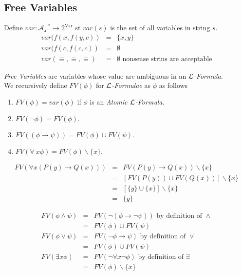 \documentclass[11pt,a4paper]{article}
\begin{document}
\subsection{Free Variables}

Define $var:\mathcal{A_L}^*\to2^\text{Var}$ st $var(s)$ is the set of all variables in string $s$.\\

\examplee{$\var(\cdot)$}
\[\begin{array}{rcl}
var(f(x,f(y,c))&=&\{x,y\}\\
var(f(c,f(c,c))&=&\emptyset\\
var(\equiv,\equiv,\equiv)&=&\emptyset\text{ nonsense strins are acceptable}
\end{array}\]

\textit{Free Variables} are variables whose value are ambiguous in an \textit{$\mathcal{L}$-Formula}.\\

We recursively define $FV(\phi)$ for \textit{$\mathcal{L}$-Formulae} as $\phi$ as follows
\begin{enumerate}
	\item $FV(\phi)=var(\phi)$ if $\phi$ is an \textit{Atomic $\mathcal{L}$-Formula}.
	\item $FV(\neg\phi)=FV(\phi)$.
	\item $FV((\phi\to\psi))=FV(\phi)\cup FV(\psi)$.
	\item $FV(\forall\ x\phi)=FV(\phi)\backslash\{x\}$.
\end{enumerate}

\[\begin{array}{rcl}
FV(\forall x(P(y)\to Q(x)))&=&FV(P(y)\to Q(x))\backslash\{x\}\\
&=&[FV(P(y))\cup FV(Q(x))]\backslash\{x\}\\
&=&[\{y\}\cup\{x\}]\backslash\{x\}\\
&=&\{y\}
\end{array}\]

\[\begin{array}{rcl}
FV(\phi\wedge\psi)&=&FV(\neg(\phi\to\neg\psi))\text{ by definition of }\wedge\\
&=&FV(\phi)\cup FV(\psi)\\
FV(\phi\vee\psi)&=&FV(\neg\phi\to\psi)\text{ by definition of }\vee\\
&=&FV(\phi)\cup FV(\psi)\\
FV(\exists x\phi)&=&FV(\neg\forall x\neg\phi)\text{ by definition of }\exists\\
&=&FV(\phi)\backslash\{x\}
\end{array}\]
\end{document}
